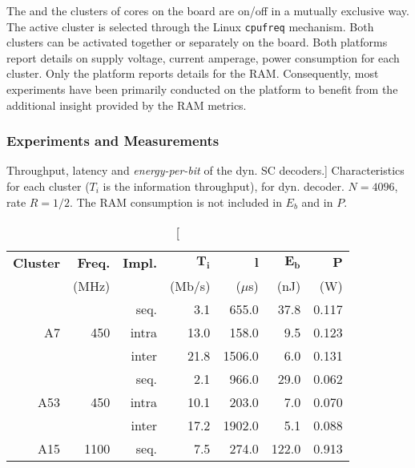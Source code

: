 The \big and the \little clusters of cores on the \odr board are on/off in a
mutually exclusive way. The active cluster is selected through the Linux
\verb|cpufreq| mechanism. Both clusters can be activated together or separately
on the \juno board. Both platforms report details on supply voltage, current
amperage, power consumption for each cluster. Only the \odr platform reports
details for the RAM. Consequently, most experiments have been primarily
conducted on the \odr platform to benefit from the additional insight provided
by the RAM metrics.

\subsubsection{Experiments and Measurements}

\begin{table}[htp]
  \centering
  \caption
    [Throughput, latency and \emph{energy-per-bit} of the dyn. SC decoders.]
    {Characteristics for each cluster ($T_i$ is the information throughput), for
    dyn. decoder. $N = 4096$, rate $R = 1/2$. The RAM
    consumption is not included in $E_b$ and in $P$.}
  \label{tab:eval_polar_energy_results}
  \begin{tabular}{r r r r r r r}
    \textbf{Cluster} & \textbf{Freq.} & \textbf{Impl.} & $\bm{T_i}$ &  $\bm{l}$ & $\boldsymbol{E_b}$ & $\bm{P}$ \\
                     &          (MHz) &                &     (Mb/s) & ($\mu$s)  &               (nJ) &      (W) \\
    \hline
    \hline
    \multirow{3}{*}{A7}        & \multirow{3}{*}{ 450} & seq.  &  3.1 &  655.0 &  37.8 & 0.117 \\
                               &                       & intra & 13.0 &  158.0 &   9.5 & 0.123 \\
                               &                       & inter & 21.8 & 1506.0 &   6.0 & 0.131 \\
    \hline
    \multirow{3}{*}{A53}       & \multirow{3}{*}{ 450} & seq.  &  2.1 &  966.0 &  29.0 & 0.062 \\
                               &                       & intra & 10.1 &  203.0 &   7.0 & 0.070 \\
                               &                       & inter & 17.2 & 1902.0 &   5.1 & 0.088 \\
    \hline
    \multirow{3}{*}{A15}       & \multirow{3}{*}{1100} & seq.  &  7.5 &  274.0 & 122.0 & 0.913 \\

\end{tabular}
\end{table}
